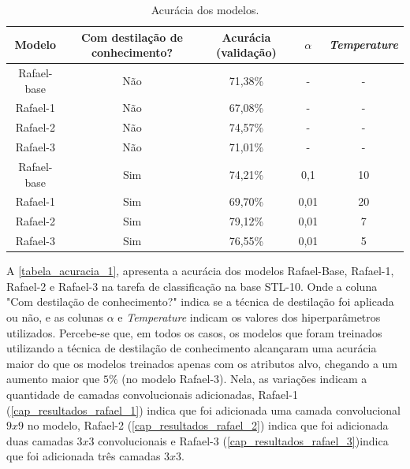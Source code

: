 \begin{center}
\begin{table}[htb]
\centering
\ABNTEXfontereduzida
\caption[Acurácia dos modelos]{Acurácia dos modelos.}
\label{tabela_acuracia_1}
\begin{tabular}{ |c|c|c|c|c| }
	\hline
	\textbf{Modelo} & \textbf{Com destilação de conhecimento?}  & \textbf{Acurácia (validação)}
		   & \textbf{$\alpha$} & \textbf{\textit{Temperature}} \\
	\hline
	Rafael-base 	& 	Não 	& 	71,38\%	& 	- 	& 	-	 \\
	Rafael-1 	& 	Não 	& 	67,08\%	& 	- 	& 	-	 \\
	Rafael-2 	& 	Não 	& 	74,57\%	& 	- 	& 	-	 \\
	Rafael-3 	& 	Não 	& 	71,01\%	& 	- 	& 	-	 \\
	Rafael-base 	& 	Sim 	& 	74,21\%	& 	0,1 	& 	10	 \\
	Rafael-1 	& 	Sim 	& 	69,70\%	& 	0,01 	& 	20	 \\
	Rafael-2 	& 	Sim 	& 	79,12\%	& 	0,01 	& 	7	 \\
	Rafael-3 	& 	Sim 	& 	76,55\%	& 	0,01 	& 	5	 \\
	\hline
\end{tabular}
\end{table}
\end{center}

A \autoref{tabela_acuracia_1}, apresenta a acurácia dos modelos Rafael-Base, Rafael-1, Rafael-2 e Rafael-3 na tarefa de
classificação na base STL-10.
Onde a coluna "Com destilação de conhecimento?" indica se a técnica de destilação foi aplicada
ou não, e as colunas $\alpha$ e \textit{Temperature} indicam os valores dos hiperparâmetros utilizados.
Percebe-se que, em todos os casos, os modelos que foram treinados utilizando a técnica de destilação de conhecimento alcançaram
uma acurácia maior do que os modelos treinados apenas com os atributos alvo, chegando a um aumento maior que $5\%$ (no modelo
Rafael-3).
Nela, as variações indicam a quantidade de camadas convolucionais adicionadas, Rafael-1
(\autoref{cap_resultados_rafael_1}) indica que foi adicionada uma camada convolucional $9x9$ no modelo, Rafael-2
(\autoref{cap_resultados_rafael_2}) indica que foi adicionada duas camadas $3x3$ convolucionais e Rafael-3
(\autoref{cap_resultados_rafael_3})indica que foi adicionada três camadas $3x3$.

